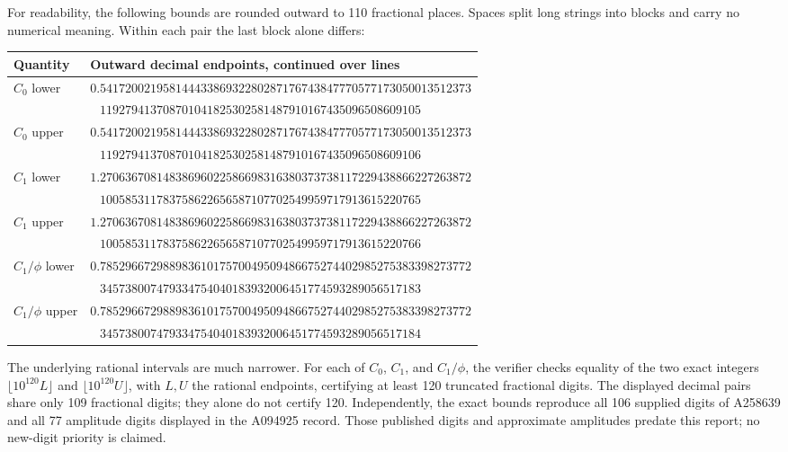 \documentclass[11pt]{article}
\theoremstyle{remark}\newtheorem{remark}[theorem]{Remark}
\begin{document}
For readability, the following bounds are rounded outward to 110 fractional places. Spaces split long strings into blocks and carry no numerical meaning. Within each pair the last block alone differs:
\begin{center}\small
\begin{tabular}{ll}
\toprule
Quantity & Outward decimal endpoints, continued over lines\\
\midrule
$C_0$ lower & $0.54172002195814443386932280287176743847770577173050013512373$\\
& $\phantom{0.}119279413708701041825302581487910167435096508609105$\\
$C_0$ upper & $0.54172002195814443386932280287176743847770577173050013512373$\\
& $\phantom{0.}119279413708701041825302581487910167435096508609106$\\[3pt]
$C_1$ lower & $1.27063670814838696022586698316380373738117229438866227263872$\\
& $\phantom{1.}100585311783758622656587107702549959717913615220765$\\
$C_1$ upper & $1.27063670814838696022586698316380373738117229438866227263872$\\
& $\phantom{1.}100585311783758622656587107702549959717913615220766$\\[3pt]
$C_1/\phi$ lower & $0.78529667298898361017570049509486675274402985275383398273772$\\
& $\phantom{0.}345738007479334754040183932006451774593289056517183$\\
$C_1/\phi$ upper & $0.78529667298898361017570049509486675274402985275383398273772$\\
& $\phantom{0.}345738007479334754040183932006451774593289056517184$\\
\bottomrule
\end{tabular}
\end{center}
The underlying rational intervals are much narrower. For each of $C_0$, $C_1$, and $C_1/\phi$, the verifier checks equality of the two exact integers $\lfloor10^{120}L\rfloor$ and $\lfloor10^{120}U\rfloor$, with $L,U$ the rational endpoints, certifying at least 120 truncated fractional digits. The displayed decimal pairs share only 109 fractional digits; they alone do not certify 120. Independently, the exact bounds reproduce all 106 supplied digits of A258639 and all 77 amplitude digits displayed in the A094925 record. Those published digits and approximate amplitudes predate this report; no new-digit priority is claimed.
\end{document}
